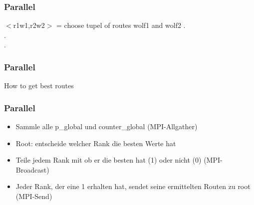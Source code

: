 \documentclass{beamer}
\begin{document}
\begin{frame}
\begin{algorithm}[H]
\frametitle{Parallel}
 $<$r1w1,r2w2$>$  = choose tupel of routes wolf1 and wolf2\;
 \parskip 12pt
 \noindent\hspace*{50mm} .\\
 \noindent\hspace*{50mm} .\\
 \noindent\hspace*{50mm} .\\
\end{algorithm}
\end{frame}

\begin{frame}
\begin{algorithm}[H]
\frametitle{Parallel}
 \caption{How to get best routes}
\end{algorithm}
\end{frame}

\begin{frame}
\frametitle{Parallel}
\begin{itemize}
\item Sammle alle p\_global und counter\_global (MPI-Allgather)
\item Root: entscheide welcher Rank die besten Werte hat
\item Teile jedem Rank mit ob er die besten hat (1) oder nicht (0) (MPI-Broadcast)
\item Jeder Rank, der eine 1 erhalten hat, sendet seine ermittelten Routen zu root (MPI-Send)
\end{itemize}
\end{frame}
\end{document}
